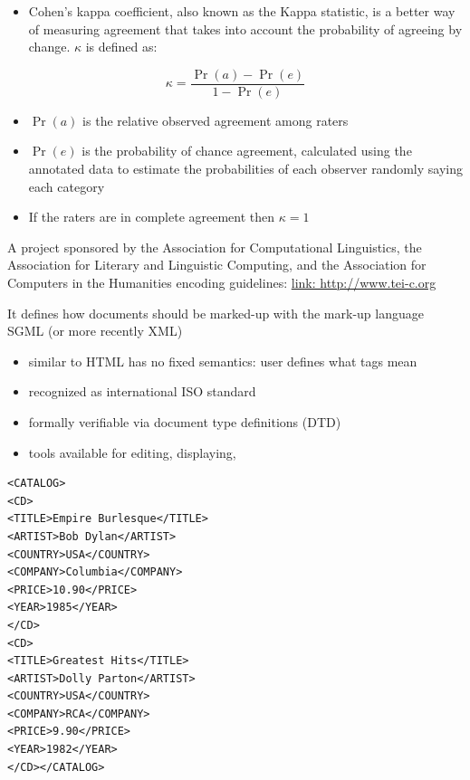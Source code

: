 \documentclass[a4paper,landscape,headrule,footrule,dvips]{foils}
\begin{document}
\begin{CJK}{UTF8}{min}

\begin{itemize}
\item Cohen's kappa coefficient, also known as the Kappa statistic, is a better way of measuring agreement that takes into account the probability of agreeing by change.  $\kappa$ is defined as:
\end{itemize}
\begin{equation}
  \label{eq:1}
  \kappa = \frac{\Pr(a) - \Pr(e)}{1 - \Pr(e)}
\end{equation}

\begin{itemize}
\item $\Pr(a)$ is the relative observed agreement among raters
\item $\Pr(e)$ is the probability of chance agreement, calculated using
the annotated data to estimate the probabilities of each observer
randomly saying each category
\item If the raters are in complete agreement then $\kappa = 1$
\end{itemize}



A project sponsored by the Association for
Computational Linguistics, the Association for
Literary and Linguistic Computing, and the
Association for Computers in the Humanities
encoding guidelines: \url{link: http://www.tei-c.org}

It defines how documents should be marked-up
with the mark-up language SGML (or more
recently XML)




\begin{itemize}
\item {} similar to HTML
has no fixed semantics: user defines what tags
mean
\item recognized as international ISO standard
\item formally verifiable via document type definitions
(DTD)
\item tools available for editing, displaying,
\end{itemize}
\begin{small}
\begin{verbatim}
<CATALOG>
<CD>
<TITLE>Empire Burlesque</TITLE>
<ARTIST>Bob Dylan</ARTIST>
<COUNTRY>USA</COUNTRY>
<COMPANY>Columbia</COMPANY>
<PRICE>10.90</PRICE>
<YEAR>1985</YEAR>
</CD>
<CD>
<TITLE>Greatest Hits</TITLE>
<ARTIST>Dolly Parton</ARTIST>
<COUNTRY>USA</COUNTRY>
<COMPANY>RCA</COMPANY>
<PRICE>9.90</PRICE>
<YEAR>1982</YEAR>
</CD></CATALOG>
\end{verbatim}
\end{small}


\end{CJK}
\end{document}
